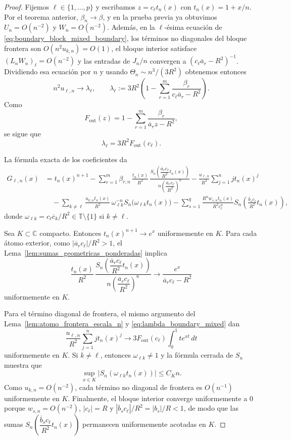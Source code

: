 \begin{proof}
	Fijemos $\ell\in\{1,\dots,p\}$ y escribamos $z=c_\ell t_n(x)$ con $t_n(x)=1+x/n$. Por el teorema anterior, $\beta_n\to\beta$, y en la prueba previa ya obtuvimos $U_n=O(n^{-2})$ y $W_n=O(n^{-2})$. Además, en la $\ell$-ésima ecuación de \eqref{eq:boundary_block_mixed_boundary}, los términos no diagonales del bloque frontera son $O(n^2u_{k,n})=O(1)$, el bloque interior satisface $(L_nW_n)_\ell=O(n^{-2})$ y las entradas de $J_n/n$ convergen a $(c_\ell\overline a_r-R^2)^{-1}$. Dividiendo esa ecuación por $n$ y usando $\Theta_n\sim n^3/(3R^2)$ obtenemos entonces
	\[
		n^2u_{\ell,n}\longrightarrow \lambda_\ell,
		\qquad
		\lambda_\ell:=3R^2\left(1-\sum_{r=1}^m\frac{\beta_r}{c_\ell\overline a_r-R^2}\right).
	\]
	Como
	\[
		F_{\mathrm{out}}(z)=1-\sum_{r=1}^m\frac{\beta_r}{\overline a_r z-R^2},
	\]
	se sigue que
	\begin{equation}\label{eq:lambda_boundary_mixed}
		\lambda_\ell=3R^2F_{\mathrm{out}}(c_\ell).
	\end{equation}

	La fórmula exacta de los coeficientes da
	\begin{align*}
		G_{\ell,n}(x)
		 & =t_n(x)^{n+1}
		-\sum_{r=1}^m \beta_{r,n}\,\frac{t_n(x)}{R^2}\,
		\frac{S_n\!\left(\dfrac{\overline a_r c_\ell}{R^2}t_n(x)\right)}{n\left(\dfrac{\overline a_r c_\ell}{R^2}\right)^n}
		-\frac{u_{\ell,n}}{R^2}\sum_{j=1}^n j t_n(x)^j \\
		 & \quad
		-\sum_{k\neq \ell}\frac{u_{k,n}t_n(x)}{R^2}\,\omega_{\ell k}^{-n}S_n\!\bigl(\omega_{\ell k}t_n(x)\bigr)
		-\sum_{s=1}^q \frac{R^n w_{s,n}t_n(x)}{R^2c_\ell^n}
		S_n\!\left(\frac{\overline b_s c_\ell}{R^2}t_n(x)\right),
	\end{align*}
	donde $\omega_{\ell k}=c_\ell\overline c_k/R^2\in\mathbb T\setminus\{1\}$ si $k\neq \ell$.

	Sea $K\subset\mathbb C$ compacto. Entonces $t_n(x)^{n+1}\to e^x$ uniformemente en $K$. Para cada átomo exterior, como $|\overline a_r c_\ell|/R^2>1$, el Lema~\ref{lem:sumas_geometricas_ponderadas} implica
	\[
		\frac{t_n(x)}{R^2}\,
		\frac{S_n\!\left(\dfrac{\overline a_r c_\ell}{R^2}t_n(x)\right)}{n\left(\dfrac{\overline a_r c_\ell}{R^2}\right)^n}
		\longrightarrow
		\frac{e^x}{\overline a_r c_\ell-R^2}
	\]
	uniformemente en $K$.

	Para el término diagonal de frontera, el mismo argumento del Lema~\ref{lem:atomo_frontera_escala_n} y \eqref{eq:lambda_boundary_mixed} dan
	\[
		\frac{u_{\ell,n}}{R^2}\sum_{j=1}^n j t_n(x)^j
		\longrightarrow
		3F_{\mathrm{out}}(c_\ell)\int_0^1 t e^{xt}\,dt
	\]
	uniformemente en $K$. Si $k\neq\ell$, entonces $\omega_{\ell k}\neq1$ y la fórmula cerrada de $S_n$ muestra que
	\[
		\sup_{x\in K}|S_n(\omega_{\ell k}t_n(x))|\le C_K n.
	\]
	Como $u_{k,n}=O(n^{-2})$, cada término no diagonal de frontera es $O(n^{-1})$ uniformemente en $K$. Finalmente, el bloque interior converge uniformemente a $0$ porque $w_{s,n}=O(n^{-2})$, $|c_\ell|=R$ y $|\overline b_s c_\ell|/R^2=|b_s|/R<1$, de modo que las sumas $S_n\!\left(\dfrac{\overline b_s c_\ell}{R^2}t_n(x)\right)$ permanecen uniformemente acotadas en $K$.


\end{proof}
